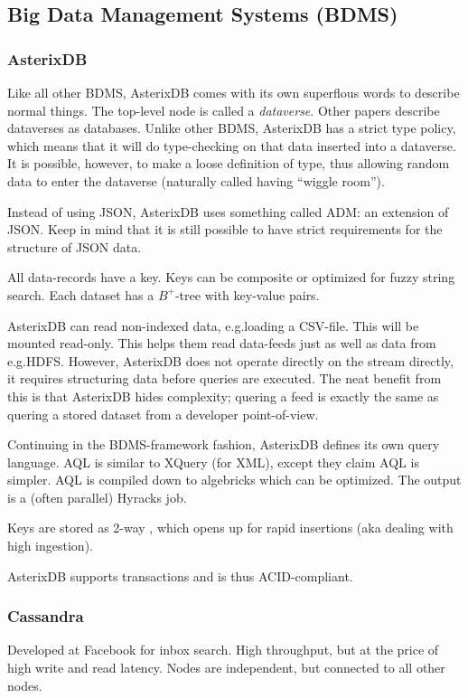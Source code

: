 \subsection{Big Data Management Systems (BDMS)}
\subsubsection{AsterixDB}\label{sec:asterixdb}
Like all other BDMS, AsterixDB comes with its own superflous words to describe
normal things. The top-level node is called a \textit{dataverse}. Other papers describe
dataverses as databases. Unlike other BDMS, AsterixDB has a strict type policy,
which means that it will do type-checking on that data inserted into a dataverse.
It is possible, however, to make a loose definition of type, thus allowing random data
to enter the dataverse (naturally called having ``wiggle room'').

Instead of using JSON, AsterixDB uses something called ADM: an
extension of JSON. Keep in mind that it is still possible to have strict
requirements for the structure of JSON data. 

All data-records have a key. Keys can be composite or optimized for fuzzy string search.
Each dataset has a $B^{+}$-tree with key-value pairs.

AsterixDB can read non-indexed data, e.g.\@ loading a CSV-file. This will be mounted read-only.
This helps them read data-feeds just as well as data from e.g.\@ HDFS. However, AsterixDB does not operate
directly on the stream directly, it requires structuring data before queries are executed.
The neat benefit from this is that AsterixDB hides complexity; quering a feed is exactly
the same as quering a stored dataset from a developer point-of-view.

Continuing in the BDMS-framework fashion, AsterixDB defines its own query language.
AQL is similar to XQuery (for XML), except they claim AQL is simpler. AQL is compiled down to algebricks
which can be optimized. The output is a (often parallel) Hyracks job.

Keys are stored as 2-way , which opens up for rapid insertions 
(aka dealing with high ingestion).

AsterixDB supports transactions and is thus ACID-compliant.



\subsubsection{Cassandra}\label{sec:cassandra}
Developed at Facebook for inbox search.
High throughput, but at the price of high write and read latency.
Nodes are independent, but connected to all other nodes.

